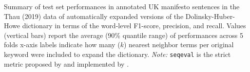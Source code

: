 Summary of test set performances in annotated UK manifesto sentences in the Thau (2019) data of automatically expanded versions of the Dolinsky-Huber-Howe dictionary in terms of the word-level F1-score, precision, and recall. Values (vertical bars) report the average (90\% quantile range) of performances across 5 folds x-axis labels indicate how many ($k$) nearest neighbor terms per original keyword were included to expand the dictionary. \emph{Note:} \texttt{seqeval} is the strict metric proposed by \citet{ramshaw_text_1995} and implemented by \citet{nakayama_seqeval_2018}. \label{fig:dictionary_expansion_wordlevel_f1_by_k}
